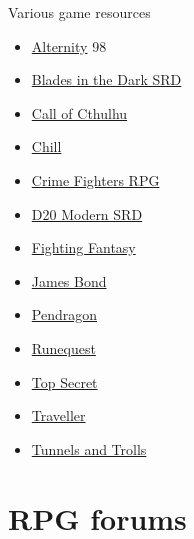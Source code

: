 \documentclass[a4paper, 11pt, twoside]{article}
\begin{document}
Various game resources
\begin{itemize}
\item \href{https://github.com/orey/ttrpg/tree/master/Alternity}{Alternity} 98
\item \href{https://github.com/orey/ttrpg/tree/master/BladesInTheDark-SRD}{Blades in the Dark SRD}
\item \href{https://github.com/orey/ttrpg/tree/master/CallOfCthulhu}{Call of Cthulhu}
\item \href{https://github.com/orey/ttrpg/tree/master/Chill}{Chill}
\item \href{https://github.com/orey/ttrpg/tree/master/CrimeFightersRPG}{Crime Fighters RPG}
\item \href{https://github.com/orey/ttrpg/tree/master/D20-Modern-SRD}{D20 Modern SRD}
\item \href{https://github.com/orey/ttrpg/tree/master/FightingFantasy}{Fighting Fantasy}
\item \href{https://github.com/orey/ttrpg/tree/master/JamesBond}{James Bond}
\item \href{https://github.com/orey/ttrpg/tree/master/Pendragon}{Pendragon}
\item \href{https://github.com/orey/ttrpg/tree/master/Runequest}{Runequest}
\item \href{https://github.com/orey/ttrpg/tree/master/TopSecret}{Top Secret}
\item \href{https://github.com/orey/ttrpg/tree/master/Traveller}{Traveller}
\item \href{https://github.com/orey/ttrpg/tree/master/TunnelsAndTrolls}{Tunnels and Trolls}
\end{itemize}

\section{RPG forums}
\label{sec:org5917137}
\end{document}
